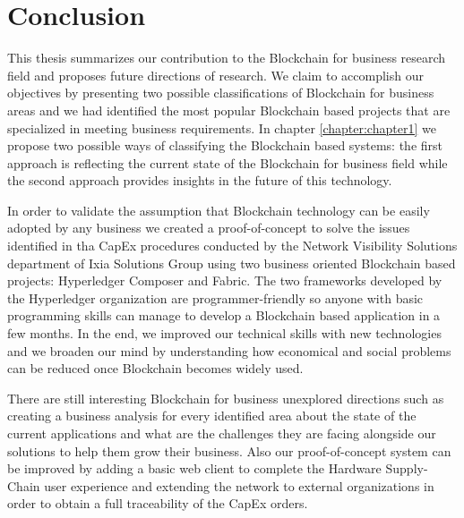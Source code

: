 \chapter{Conclusion}
\label{chapter:conclusion}

This thesis summarizes our contribution to the Blockchain for business research field and proposes future directions of research.
We claim to accomplish our objectives by presenting two possible classifications of Blockchain for business areas and we had identified the most popular Blockchain based projects that are specialized in meeting business requirements.
In chapter \ref{chapter:chapter1} we propose two possible ways of classifying the Blockchain based systems: the first approach is reflecting the current state of the Blockchain for business field while the second approach provides insights in the future of this technology.

In order to validate the assumption that Blockchain technology can be easily adopted by any business we created a proof-of-concept to solve the issues identified in tha CapEx procedures conducted by the Network Visibility Solutions department of Ixia Solutions Group using two business oriented Blockchain based projects: Hyperledger Composer and Fabric. The two frameworks developed by the Hyperledger organization are programmer-friendly so anyone with basic programming skills can manage to develop a Blockchain based application in a few months. In the end, we improved our technical skills with new technologies and we broaden our mind by understanding how economical and social problems can be reduced once Blockchain becomes widely used.

There are still interesting Blockchain for business unexplored directions such as creating a business analysis for every identified area about the state of the current applications and what are the challenges they are facing alongside our solutions to help them grow their business.
Also our proof-of-concept system can be improved by adding a basic web client to complete the Hardware Supply-Chain user experience and extending the network to external organizations in order to obtain a full traceability of the CapEx orders.